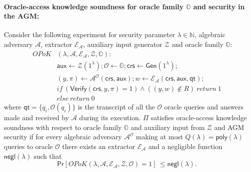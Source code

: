 \paragraph{Oracle-access knowledge soundness for oracle family $\mathbb{O}$ and security in the AGM:} Consider the following experiment for security 
parameter $\lambda \in \mathbb{N}$, algebraic adversary $\mathcal{A}$, extractor $\mathcal{E}_{\mathcal{A}}$, auxiliary 
input generator $\mathcal{Z}$ and oracle family $\mathbb{O}$:\\
\begin{align*}
\mathit{OPoK}&(\lambda, \mathcal{A}, \mathcal{E}_{\mathcal{A}}, \mathcal{Z}, \mathbb{O}): \\
& \mathsf{aux} \leftarrow \mathcal{Z}(1^{\lambda}); \mathcal{O} \leftarrow \mathbb{O}; \mathsf{crs} \leftarrow \mathsf{Gen}(1^{\lambda}); \\
& (y,\pi) \leftarrow \mathcal{A}^{\mathcal{O}}(\mathsf{crs},\mathsf{aux}); w \leftarrow \mathcal{E}_{\mathcal{A}}(\mathsf{crs}, \mathsf{aux}, \mathsf{qt}); \\
& \mathit{if} \ (\mathsf{Verify}(\mathsf{crs}, y, \pi) = 1) \wedge ((y,w) \notin R) \ \mathit{return}  \ 1 \\
& \mathit{else} \ \mathit{return} \ 0
\end{align*}
\noindent where $\mathsf{qt} = \{q_i, \mathcal{O}(q_i)\}$ is the transcript of all the $\mathcal{O}$ oracle queries and answers made and received by 
$\mathcal{A}$ during its execution. $\Pi$ satisfies oracle-access knowledge soundness with respect to oracle family  $\mathbb{O}$ and auxiliary 
input from $\mathcal{Z}$ and AGM security if for every algebraic adversary $\mathcal{A}^{\mathcal{O}}$  
making at most $Q(\lambda) = \mathsf{poly}(\lambda)$ queries to oracle $\mathcal{O}$ there exists an extractor 
$\mathcal{E}_{\mathcal{A}}$ and a negligible function $\mathsf{negl}(\lambda)$ such that 
$$\mathsf{Pr}[\mathit{OPoK}(\lambda, \mathcal{A}, \mathcal{E}_{\mathcal{A}}, \mathcal{Z}, \mathcal{O}) =  1]\ \leq \mathsf{negl}(\lambda).$$ 


